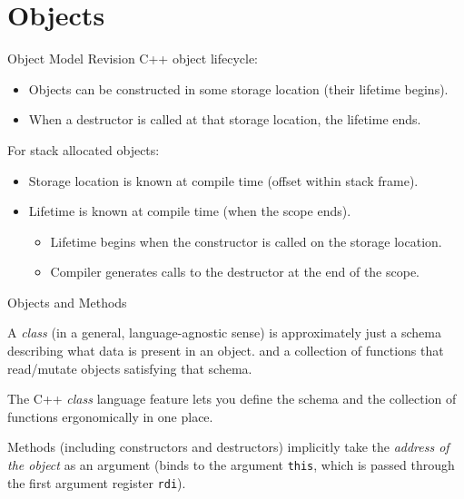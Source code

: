 \section{Objects}

\begin{frame}[fragile]{Object Model Revision}
  C++ object lifecycle:
  \begin{itemize}
    \item Objects can be constructed in some storage location (their lifetime begins).
    \item When a destructor is called at that storage location, the lifetime ends.
  \end{itemize}

  For stack allocated objects:
  \begin{itemize}
    \item Storage location is known at compile time (offset within stack frame).
    \item Lifetime is known at compile time (when the scope ends).
    \begin{itemize}
      \item Lifetime begins when the constructor is called on the storage location.
      \item Compiler generates calls to the destructor at the end of the scope.
    \end{itemize}
  \end{itemize}
\end{frame}

\begin{frame}[fragile]{Objects and Methods}
  \begin{sqt:definition}
    A \emph{class} (in a general, language-agnostic sense) is approximately just a schema describing what data is present in an object.
    and a collection of functions that read/mutate objects satisfying that schema.
  \end{sqt:definition}

  \begin{sqt:definition}
    The C++ \emph{class} language feature lets you define the schema and the collection of functions ergonomically in one place.
  \end{sqt:definition}

  Methods (including constructors and destructors) implicitly take the \emph{address of the object} as an argument
  (binds to the argument \verb|this|, which is passed through the first argument register \verb|rdi|).
\end{frame}


